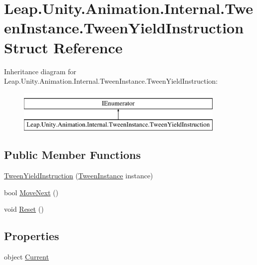 \hypertarget{struct_leap_1_1_unity_1_1_animation_1_1_internal_1_1_tween_instance_1_1_tween_yield_instruction}{}\section{Leap.\+Unity.\+Animation.\+Internal.\+Tween\+Instance.\+Tween\+Yield\+Instruction Struct Reference}
\label{struct_leap_1_1_unity_1_1_animation_1_1_internal_1_1_tween_instance_1_1_tween_yield_instruction}
Inheritance diagram for Leap.\+Unity.\+Animation.\+Internal.\+Tween\+Instance.\+Tween\+Yield\+Instruction\+:\begin{figure}[H]
\begin{center}
\leavevmode
\includegraphics[height=2.000000cm]{struct_leap_1_1_unity_1_1_animation_1_1_internal_1_1_tween_instance_1_1_tween_yield_instruction}
\end{center}
\end{figure}
\subsection*{Public Member Functions}
\begin{DoxyCompactItemize}
\item 
\mbox{\hyperlink{struct_leap_1_1_unity_1_1_animation_1_1_internal_1_1_tween_instance_1_1_tween_yield_instruction_a431c8d7c3d243c3394c5f8c75117bb11}{Tween\+Yield\+Instruction}} (\mbox{\hyperlink{class_leap_1_1_unity_1_1_animation_1_1_internal_1_1_tween_instance}{Tween\+Instance}} instance)
\item 
bool \mbox{\hyperlink{struct_leap_1_1_unity_1_1_animation_1_1_internal_1_1_tween_instance_1_1_tween_yield_instruction_a59bd41bde37d3010b7c4ef39eeb7d290}{Move\+Next}} ()
\item 
void \mbox{\hyperlink{struct_leap_1_1_unity_1_1_animation_1_1_internal_1_1_tween_instance_1_1_tween_yield_instruction_a05409b12fe1de6ea005b57b9d6913fa1}{Reset}} ()
\end{DoxyCompactItemize}
\subsection*{Properties}
\begin{DoxyCompactItemize}
\item 
object \mbox{\hyperlink{struct_leap_1_1_unity_1_1_animation_1_1_internal_1_1_tween_instance_1_1_tween_yield_instruction_adf16aaea858054e4bf534421be8f42bd}{Current}}
\end{DoxyCompactItemize}


